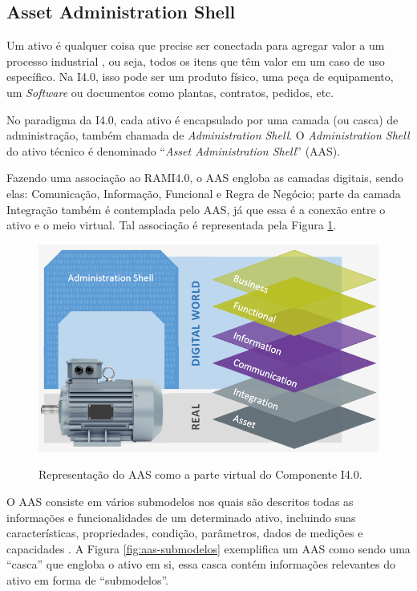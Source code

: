 \documentclass[
	12pt,				%
	oneside,			%
	a4paper,			%
	english,			%
	brazil				%
]{abntex2}
\begin{document}
	\pagebreak
	\subsection{Asset Administration Shell}
	
	Um ativo é qualquer coisa que precise ser conectada para agregar valor a um processo industrial \cite{zvei2019aas}, ou seja, todos os itens que têm valor em um caso de uso específico. Na I4.0, isso pode ser um produto físico, uma peça de equipamento, um \textit{Software} ou documentos como plantas, contratos, pedidos, etc.
	
	No paradigma da I4.0, cada ativo é encapsulado por uma camada (ou casca) de administração, também chamada de \textit{Administration Shell}. O \textit{Administration Shell} do ativo técnico é denominado ``\textit{Asset Administration Shell}'' (AAS).
	
	Fazendo uma associação ao RAMI4.0, o AAS engloba as camadas digitais, sendo elas: Comunicação, Informação, Funcional e Regra de Negócio; parte da camada Integração também é contemplada pelo AAS, já que essa é a conexão entre o ativo e o meio virtual. Tal associação é representada pela Figura \ref{fig:aas-rami}.

	\begin{figure}[H]
		\centering
		\caption{Representação do AAS como a parte virtual do Componente I4.0.}
		\includegraphics[width=1\textwidth]{aas-rami.png}
		\label{fig:aas-rami}
	\end{figure}
		
	O AAS consiste em vários submodelos nos quais são descritos todas as informações e funcionalidades de um determinado ativo, incluindo suas características, propriedades, condição, parâmetros, dados de medições e capacidades \cite{bader2019aas}. A Figura \ref{fig:aas-submodelos} exemplifica um AAS como sendo uma ``casca'' que engloba o ativo em si, essa casca contém informações relevantes do ativo em forma de ``submodelos''.
	
\end{document}
